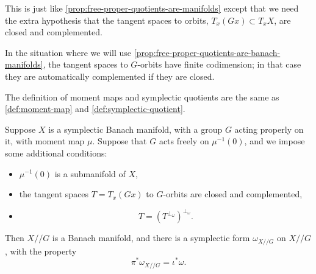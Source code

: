 \documentclass[12pt,letterpaper,reqno]{article}
\numberwithin{equation}{section}
\newcommand{\fg}{{\mathfrak g}}
\newcommand{\kq}{/\!\!/}
\DeclareMathOperator{\im}{Im}
\newcommand{\fixme}[1]{{\color{orange}{[#1]}}}
\begin{document}
\begin{prop} \label{prop:free-proper-quotients-are-banach-manifolds}
This is just like \autoref{prop:free-proper-quotients-are-manifolds}
except that we need the extra hypothesis that the
tangent spaces to orbits,
$T_x (Gx) \subset T_x X$, are closed and complemented. \fixme{ref Bourbaki}
\end{prop}


In the situation where we will use
\autoref{prop:free-proper-quotients-are-banach-manifolds}, the
tangent spaces to $G$-orbits have finite codimension; in that
case they are automatically complemented if they are closed.

\begin{defn} \label{def:banach-mm-and-sq}
The definition of moment maps and symplectic quotients are the same
as \autoref{def:moment-map} and \autoref{def:symplectic-quotient}.
\end{defn}

\begin{thm} \label{prop:banach-symplectic-quotient-is-symplectic}
Suppose $X$ is a symplectic Banach manifold, with a group $G$
acting properly on it, with moment map $\mu$.
Suppose that $G$ acts freely on $\mu^{-1}(0)$, and we impose
some additional conditions:
\begin{itemize}
\item $\mu^{-1}(0)$ is a submanifold of $X$,
\item the tangent
spaces $T = T_x (Gx)$ to $G$-orbits are closed and complemented,
\item \begin{equation}
  T = (T^{\perp_\omega})^{\perp_\omega}.
\end{equation}
\end{itemize}
Then $X \kq G$ is a Banach manifold, and there is a
symplectic form $\omega_{X \kq G}$ on $X \kq G$, with the
property
\begin{equation}
  \pi^* \omega_{X \kq G} = \iota^* \omega.
\end{equation}
\end{thm}
\end{document}
